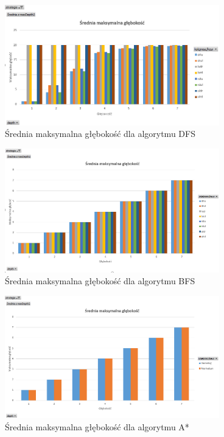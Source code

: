 \documentclass{classrep}
\begin{document}
\begin{figure}[h!]
    \centering
    \includegraphics[width=0.83\textwidth]{maxdepthDFS.png}
    \caption{Średnia maksymalna głębokość dla algorytmu DFS}
	\label{maxdepthDFS}
\end{figure}
\begin{figure}[h!]
    \centering
    \includegraphics[width=0.83\textwidth]{maxdepthBFS.png}
    \caption{Średnia maksymalna głębokość dla algorytmu BFS}
	\label{maxdepthBFS}
\end{figure}
\begin{figure}[h!]
    \centering
    \includegraphics[width=0.83\textwidth]{maxdepthAstar.png}
    \caption{Średnia maksymalna głębokość dla algorytmu A*}
	\label{maxdepthAstar}
\end{figure}
\end{document}
